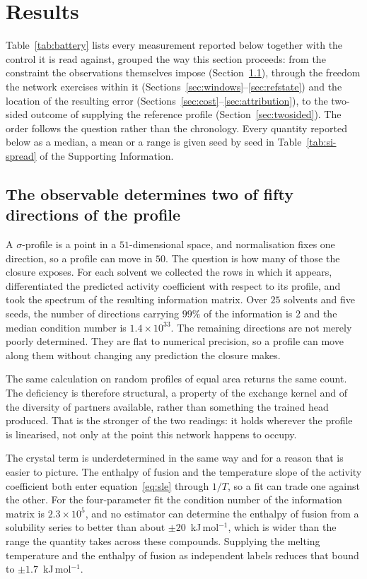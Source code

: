\section{Results}
\label{sec:results}

Table~\ref{tab:battery} lists every measurement reported below together with the control it is
read against, grouped the way this section proceeds: from the constraint the observations
themselves impose (Section~\ref{sec:determined}), through the freedom the network exercises within
it (Sections~\ref{sec:windows}--\ref{sec:refstate}) and the location of the resulting error
(Sections~\ref{sec:cost}--\ref{sec:attribution}), to the two-sided outcome of supplying the
reference profile (Section~\ref{sec:twosided}). The order follows the question rather than the
chronology. Every quantity reported below as a median, a mean or a range is given seed by seed in
Table~\ref{tab:si-spread} of the Supporting Information.

\subsection{The observable determines two of fifty directions of the profile}
\label{sec:determined}

A $\sigma$-profile is a point in a $51$-dimensional space, and normalisation fixes one direction,
so a profile can move in $50$. The question is how many of those the closure exposes. For each
solvent we collected the rows in which it appears, differentiated the predicted activity
coefficient with respect to its profile, and took the spectrum of the resulting information
matrix. Over $25$ solvents and five seeds, the number of directions carrying $99\%$ of the
information is $2$ and the median condition number is $1.4\times10^{33}$.
The remaining directions are not merely poorly determined. They are flat to numerical precision,
so a profile can move along them without changing any prediction the closure makes.

The same calculation on random profiles of equal area returns the same count. The deficiency is
therefore structural, a property of the exchange kernel and of the diversity of partners
available, rather than something the trained head produced. That is the stronger of the two
readings: it holds wherever the profile is linearised, not only at the point this network happens
to occupy.

The crystal term is underdetermined in the same way and for a reason that is easier to picture.
The enthalpy of fusion and the temperature slope of the activity coefficient both enter
equation~\eqref{eq:sle} through $1/T$, so a fit can trade one against the other. For the
four-parameter fit the condition number of the information matrix is $2.3\times10^{5}$, and no
estimator can determine the enthalpy of fusion from a solubility series to better than about
$\pm20$~kJ\,mol$^{-1}$, which is wider than the range the quantity takes across these compounds.
Supplying the melting temperature and the enthalpy of fusion as independent labels reduces that
bound to $\pm1.7$~kJ\,mol$^{-1}$.

